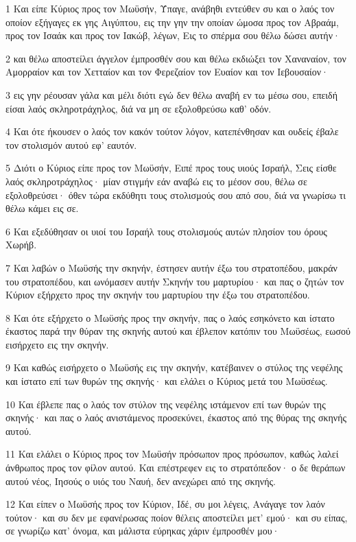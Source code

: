 \par 1 Και είπε Κύριος προς τον Μωϋσήν, Ύπαγε, ανάβηθι εντεύθεν συ και ο λαός τον οποίον εξήγαγες εκ γης Αιγύπτου, εις την γην την οποίαν ώμοσα προς τον Αβραάμ, προς τον Ισαάκ και προς τον Ιακώβ, λέγων, Εις το σπέρμα σου θέλω δώσει αυτήν·
\par 2 και θέλω αποστείλει άγγελον έμπροσθέν σου και θέλω εκδιώξει τον Χαναναίον, τον Αμορραίον και τον Χετταίον και τον Φερεζαίον τον Ευαίον και τον Ιεβουσαίον·
\par 3 εις γην ρέουσαν γάλα και μέλι διότι εγώ δεν θέλω αναβή εν τω μέσω σου, επειδή είσαι λαός σκληροτράχηλος, διά να μη σε εξολοθρεύσω καθ' οδόν.
\par 4 Και ότε ήκουσεν ο λαός τον κακόν τούτον λόγον, κατεπένθησαν και ουδείς έβαλε τον στολισμόν αυτού εφ' εαυτόν.
\par 5 Διότι ο Κύριος είπε προς τον Μωϋσήν, Ειπέ προς τους υιούς Ισραήλ, Σεις είσθε λαός σκληροτράχηλος· μίαν στιγμήν εάν αναβώ εις το μέσον σου, θέλω σε εξολοθρεύσει· όθεν τώρα εκδύθητι τους στολισμούς σου από σου, διά να γνωρίσω τι θέλω κάμει εις σε.
\par 6 Και εξεδύθησαν οι υιοί του Ισραήλ τους στολισμούς αυτών πλησίον του όρους Χωρήβ.
\par 7 Και λαβών ο Μωϋσής την σκηνήν, έστησεν αυτήν έξω του στρατοπέδου, μακράν του στρατοπέδου, και ωνόμασεν αυτήν Σκηνήν του μαρτυρίου· και πας ο ζητών τον Κύριον εξήρχετο προς την σκηνήν του μαρτυρίου την έξω του στρατοπέδου.
\par 8 Και ότε εξήρχετο ο Μωϋσής προς την σκηνήν, πας ο λαός εσηκόνετο και ίστατο έκαστος παρά την θύραν της σκηνής αυτού και έβλεπον κατόπιν του Μωϋσέως, εωσού εισήρχετο εις την σκηνήν.
\par 9 Και καθώς εισήρχετο ο Μωϋσής εις την σκηνήν, κατέβαινεν ο στύλος της νεφέλης και ίστατο επί των θυρών της σκηνής· και ελάλει ο Κύριος μετά του Μωϋσέως.
\par 10 Και έβλεπε πας ο λαός τον στύλον της νεφέλης ιστάμενον επί των θυρών της σκηνής· και πας ο λαός ανιστάμενος προσεκύνει, έκαστος από της θύρας της σκηνής αυτού.
\par 11 Και ελάλει ο Κύριος προς τον Μωϋσήν πρόσωπον προς πρόσωπον, καθώς λαλεί άνθρωπος προς τον φίλον αυτού. Και επέστρεφεν εις το στρατόπεδον· ο δε θεράπων αυτού νέος, Ιησούς ο υιός του Ναυή, δεν ανεχώρει από της σκηνής.
\par 12 Και είπεν ο Μωϋσής προς τον Κύριον, Ιδέ, συ μοι λέγεις, Ανάγαγε τον λαόν τούτον· και συ δεν με εφανέρωσας ποίον θέλεις αποστείλει μετ' εμού· και συ είπας, σε γνωρίζω κατ' όνομα, και μάλιστα εύρηκας χάριν έμπροσθέν μου·
